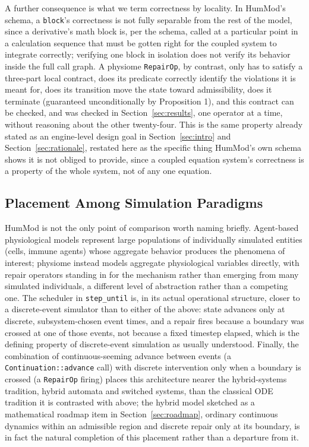 \documentclass[11pt]{article}
\begin{document}
A further consequence is what we term correctness by locality. In HumMod's schema, a \texttt{block}'s correctness is not fully separable from the rest of the model, since a derivative's math block is, per the schema, called at a particular point in a calculation sequence that must be gotten right for the coupled system to integrate correctly; verifying one block in isolation does not verify its behavior inside the full call graph. A physiome \texttt{RepairOp}, by contrast, only has to satisfy a three-part local contract, does its predicate correctly identify the violations it is meant for, does its transition move the state toward admissibility, does it terminate (guaranteed unconditionally by Proposition 1), and this contract can be checked, and was checked in Section~\ref{sec:results}, one operator at a time, without reasoning about the other twenty-four. This is the same property already stated as an engine-level design goal in Section~\ref{sec:intro} and Section~\ref{sec:rationale}, restated here as the specific thing HumMod's own schema shows it is not obliged to provide, since a coupled equation system's correctness is a property of the whole system, not of any one equation.

\subsection{Placement Among Simulation Paradigms}

HumMod is not the only point of comparison worth naming briefly. Agent-based physiological models represent large populations of individually simulated entities (cells, immune agents) whose aggregate behavior produces the phenomena of interest; physiome instead models aggregate physiological variables directly, with repair operators standing in for the mechanism rather than emerging from many simulated individuals, a different level of abstraction rather than a competing one. The scheduler in \texttt{step\_until} is, in its actual operational structure, closer to a discrete-event simulator than to either of the above: state advances only at discrete, subsystem-chosen event times, and a repair fires because a boundary was crossed at one of those events, not because a fixed timestep elapsed, which is the defining property of discrete-event simulation as usually understood. Finally, the combination of continuous-seeming advance between events (a \texttt{Continuation::advance} call) with discrete intervention only when a boundary is crossed (a \texttt{RepairOp} firing) places this architecture nearer the hybrid-systems tradition, hybrid automata and switched systems, than the classical ODE tradition it is contrasted with above; the hybrid model sketched as a mathematical roadmap item in Section~\ref{sec:roadmap}, ordinary continuous dynamics within an admissible region and discrete repair only at its boundary, is in fact the natural completion of this placement rather than a departure from it.
\end{document}
